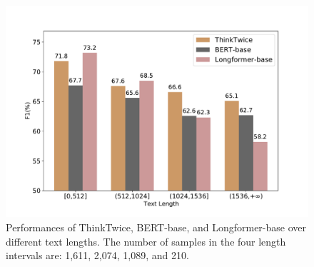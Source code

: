\begin{figure}
    \centering
    \includegraphics[scale=0.7]{figure/3-3.pdf}
    \caption{Performances of ThinkTwice, BERT-base, and Longformer-base over different text lengths. The number of samples in the four length intervals are: 1,611, 2,074, 1,089, and 210.}
    \label{fig:3-3}
\end{figure}

